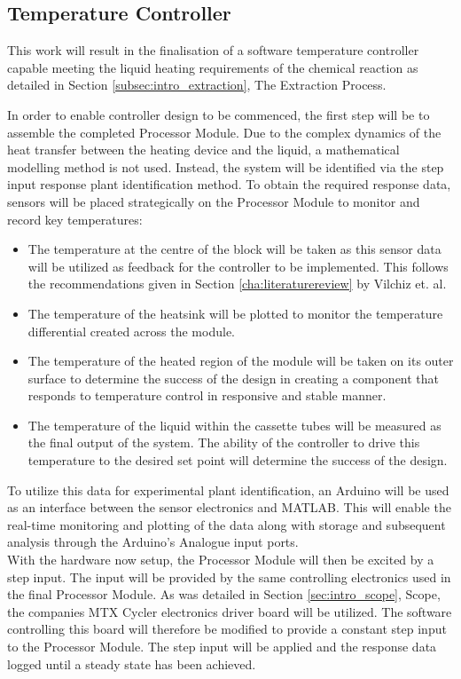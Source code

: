 \subsection{Temperature Controller}

This work will result in the finalisation of a software temperature controller capable meeting the liquid heating requirements of the chemical reaction as detailed in Section \ref{subsec:intro_extraction}, The Extraction Process.

In order to enable controller design to be commenced, the first step will be to assemble the completed Processor Module. Due to the complex dynamics of the heat transfer between the heating device and the liquid, a mathematical modelling method is not used. Instead, the system will be identified via the step input response plant identification method. To obtain the required response data, sensors will be placed strategically on the Processor Module to monitor and record key temperatures:
\begin{itemize}
	\item The temperature at the centre of the block will be taken as this sensor data will be utilized as feedback for the controller to be implemented. This follows the recommendations given in Section \ref{cha:literaturereview} by Vilchiz et. al.
	\item The temperature of the heatsink will be plotted to monitor the temperature differential created across the module.
	\item The temperature of the heated region of the module will be taken on its outer surface to determine the success of the design in creating a component that responds to temperature control in responsive and stable manner.
	\item The temperature of the liquid within the cassette tubes will be measured as the final output of the system. The ability of the controller to drive this temperature to the desired set point will determine the success of the design.
\end{itemize}

To utilize this data for experimental plant identification, an Arduino will be used as an interface between the sensor electronics and MATLAB. This will enable the real-time monitoring and plotting of the data along with storage and subsequent analysis through the Arduino's Analogue input ports.\\

With the hardware now setup, the Processor Module will then be excited by a step input. The input will be provided by the same controlling electronics used in the final Processor Module. As was detailed in Section \ref{sec:intro_scope}, Scope, the companies MTX Cycler electronics driver board will be utilized. The software controlling this board will therefore be modified to provide a constant step input to the Processor Module. The step input will be applied and the response data logged until a steady state has been achieved.\\

